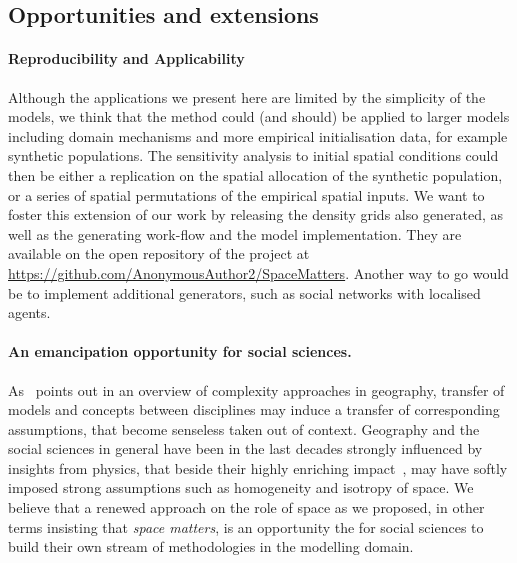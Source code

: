 \documentclass[3p,times,procedia]{elsarticle}
\begin{document}
\subsection{Opportunities and extensions}


\paragraph{Reproducibility and Applicability} 


Although the applications we present here are limited by the simplicity of the models, we think that the method could (and should) be applied to larger models including domain mechanisms and more empirical initialisation data, for example synthetic populations. The sensitivity analysis to initial spatial conditions could then be either a replication on the spatial allocation of the synthetic population, or a series of spatial permutations of the empirical spatial inputs.
We want to foster this extension of our work by releasing the density grids also generated, as well as the generating work-flow and the model implementation. They are available on the open repository of the project at \url{https://github.com/AnonymousAuthor2/SpaceMatters}. Another way to go would be to implement additional generators, such as social networks \citep{alizadeh2016generating} with localised agents. 


\paragraph{An emancipation opportunity for social sciences.}


As~\citet{pumain2003approche} points out in an overview of complexity approaches in geography, transfer of models and concepts between disciplines may induce a transfer of corresponding assumptions, that become senseless taken out of context. Geography and the social sciences in general have been in the last decades strongly influenced by insights from physics, that beside their highly enriching impact~\citep{o2015physicists}, may have softly imposed strong assumptions such as homogeneity and isotropy of space. We believe that a renewed approach on the role of space as we proposed, in other terms insisting that \emph{space matters}, is an opportunity the for social sciences to build their own stream of methodologies in the modelling domain.



\end{document}
